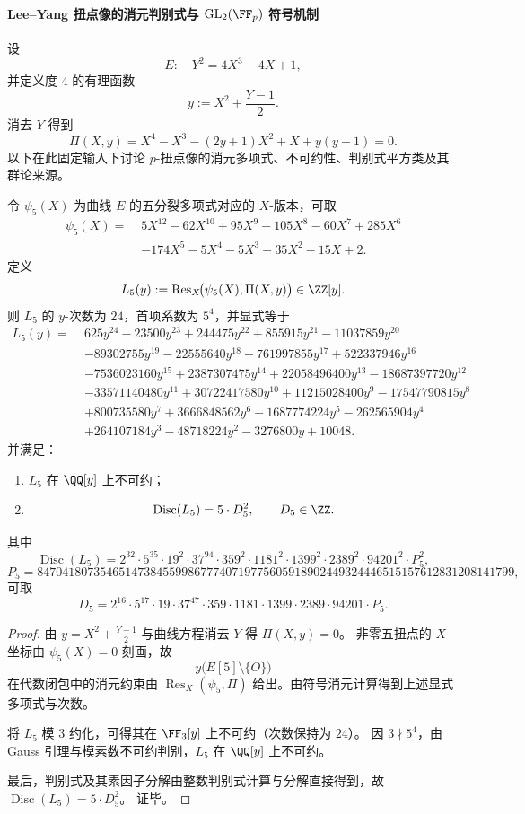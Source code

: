 \paragraph{Lee--Yang 扭点像的消元判别式与 \texorpdfstring{$\mathrm{GL}_2(\FF_p)$}{GL2(Fp)} 符号机制}
设
\[
E:\quad Y^2=4X^3-4X+1,
\]
并定义度 \(4\) 的有理函数
\[
y:=X^2+\frac{Y-1}{2}.
\]
消去 \(Y\) 得到
\[
\Pi(X,y)=X^4-X^3-(2y+1)X^2+X+y(y+1)=0.
\]
以下在此固定输入下讨论 \(p\)-扭点像的消元多项式、不可约性、判别式平方类及其群论来源。

\begin{theorem}\label{thm:xi-leyang-image-five-torsion-elimination-irreducibility-discriminant}
令 \(\psi_5(X)\) 为曲线 \(E\) 的五分裂多项式对应的 \(X\)-版本，可取
\[
\begin{aligned}
\psi_5(X)=\;&5X^{12}-62X^{10}+95X^9-105X^8-60X^7+285X^6\\
&-174X^5-5X^4-5X^3+35X^2-15X+2.
\end{aligned}
\]
定义
\[
L_5(y):=\operatorname{Res}_X\!\bigl(\psi_5(X),\Pi(X,y)\bigr)\in\ZZ[y].
\]
则 \(L_5\) 的 \(y\)-次数为 \(24\)，首项系数为 \(5^4\)，并显式等于
\[
\begin{aligned}
L_5(y)=\;&625y^{24}-23500y^{23}+244475y^{22}+855915y^{21}-11037859y^{20}\\
&-89302755y^{19}-22555640y^{18}+761997855y^{17}+522337946y^{16}\\
&-7536023160y^{15}+2387307475y^{14}+22058496400y^{13}-18687397720y^{12}\\
&-33571140480y^{11}+30722417580y^{10}+11215028400y^9-17547790815y^8\\
&+800735580y^7+3666848562y^6-1687774224y^5-262565904y^4\\
&+264107184y^3-48718224y^2-3276800y+10048.
\end{aligned}
\]
并满足：
\begin{enumerate}
  \item \(L_5\) 在 \(\QQ[y]\) 上不可约；
  \item
  \[
  \operatorname{Disc}(L_5)=5\cdot D_5^2,\qquad D_5\in\ZZ.
  \]
\end{enumerate}
其中
\[
\operatorname{Disc}(L_5)
=
2^{32}\cdot 5^{35}\cdot 19^2\cdot 37^{94}\cdot 359^2\cdot 1181^2\cdot 1399^2\cdot 2389^2\cdot 94201^2\cdot P_5^2,
\]
\[
P_5=
8470418073546514738455998677740719775605918902449324446515157612831208141799,
\]
可取
\[
D_5=
2^{16}\cdot 5^{17}\cdot 19\cdot 37^{47}\cdot 359\cdot 1181\cdot 1399\cdot 2389\cdot 94201\cdot P_5.
\]
\end{theorem}
\begin{proof}
由 \(y=X^2+\frac{Y-1}{2}\) 与曲线方程消去 \(Y\) 得 \(\Pi(X,y)=0\)。
非零五扭点的 \(X\)-坐标由 \(\psi_5(X)=0\) 刻画，故
\[
y\bigl(E[5]\setminus\{O\}\bigr)
\]
在代数闭包中的消元约束由
\(
\operatorname{Res}_X(\psi_5,\Pi)
\)
给出。由符号消元计算得到上述显式多项式与次数。

将 \(L_5\) 模 \(3\) 约化，可得其在 \(\FF_3[y]\) 上不可约（次数保持为 \(24\)）。
因 \(3\nmid 5^4\)，由 Gauss 引理与模素数不可约判别，\(L_5\) 在 \(\QQ[y]\) 上不可约。

最后，判别式及其素因子分解由整数判别式计算与分解直接得到，故
\(
\operatorname{Disc}(L_5)=5\cdot D_5^2
\)。
证毕。
\end{proof}

